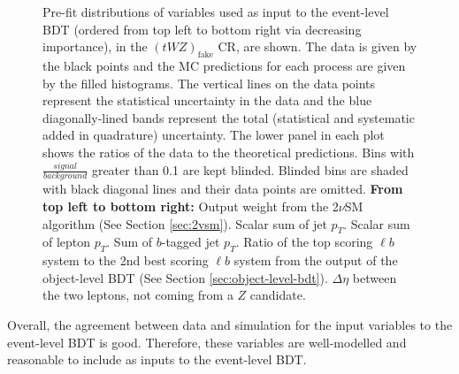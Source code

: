 \begin{figure}[htbp]
\caption{Pre-fit distributions of variables used as input to the event-level BDT (ordered from top left to bottom right via decreasing importance), in the $(tWZ)_{\text{fake}}$ CR, are shown. The data is given by the black points and the MC predictions for each process are given by the filled histograms. The vertical lines on the data points represent the statistical uncertainty in the data and the blue diagonally-lined bands represent the total (statistical and systematic added in quadrature) uncertainty. The lower panel in each plot shows the ratios of the data to the theoretical predictions. Bins with $\frac{signal}{background}$ greater than 0.1 are kept blinded. Blinded bins are shaded with black diagonal lines and their data points are omitted. \textbf{From top left to bottom right:} Output weight from the 2$\nu$SM algorithm (See Section \ref{sec:2vsm}). Scalar sum of jet $p_{T}$. Scalar sum of lepton $p_{T}$. Sum of $b$-tagged jet $p_{T}$. Ratio of the top scoring $\ell b$ system to the 2nd best scoring $\ell b$ system from the output of the object-level BDT (See Section \ref{sec:object-level-bdt}). $\Delta \eta$ between the two leptons, not coming from a $Z$ candidate.}
  \label{fig:4lep-tWZfakeCR-eventbdt-vars}
\end{figure}

Overall, the agreement between data and simulation for the input variables to the event-level BDT is good. Therefore, these variables are well-modelled and reasonable to include as inputs to the event-level BDT.\\

